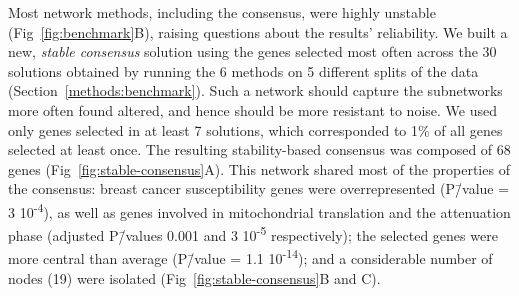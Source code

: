 \documentclass[10pt,letterpaper]{article}
\begin{document}
Most network methods, including the consensus, were highly unstable (Fig~\ref{fig:benchmark}B), raising questions about the results' reliability. We built a new, \emph{stable consensus} solution using the genes selected most often across the 30 solutions obtained by running the 6 methods on 5 different splits of the data (Section~\ref{methods:benchmark}). Such a network should capture the subnetworks more often found altered, and hence should be more resistant to noise. We used only genes selected in at least 7 solutions, which corresponded to 1\% of all genes selected at least once. The resulting stability-based consensus was composed of 68 genes (Fig~\ref{fig:stable-consensus}A). This network shared most of the properties of the consensus: breast cancer susceptibility genes were overrepresented (P\=/value = 3 \texttimes{} 10\textsuperscript{-4}), as well as genes involved in mitochondrial translation and the attenuation phase (adjusted P\=/values 0.001 and 3 \texttimes{} 10\textsuperscript{-5} respectively); the selected genes were more central than average (P\=/value = 1.1 \texttimes{} 10\textsuperscript{-14}); and a considerable number of nodes (19) were isolated (Fig~\ref{fig:stable-consensus}B and C).
\end{document}
